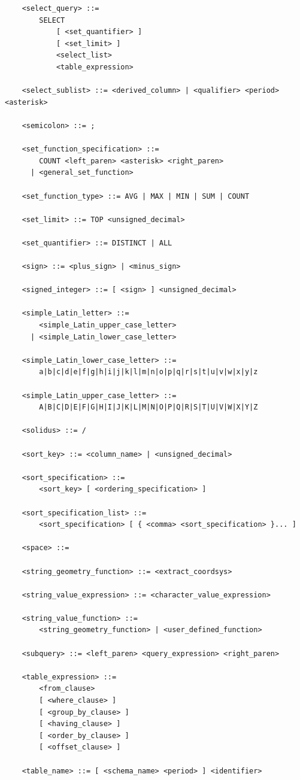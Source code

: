 \documentclass[11pt,a4paper]{ivoa}
\begin{document}
\begin{verbatim}
    <select_query> ::=
        SELECT
            [ <set_quantifier> ]
            [ <set_limit> ]
            <select_list>
            <table_expression>

    <select_sublist> ::= <derived_column> | <qualifier> <period> <asterisk>

    <semicolon> ::= ;

    <set_function_specification> ::=
        COUNT <left_paren> <asterisk> <right_paren>
      | <general_set_function>

    <set_function_type> ::= AVG | MAX | MIN | SUM | COUNT

    <set_limit> ::= TOP <unsigned_decimal>

    <set_quantifier> ::= DISTINCT | ALL

    <sign> ::= <plus_sign> | <minus_sign>

    <signed_integer> ::= [ <sign> ] <unsigned_decimal>

    <simple_Latin_letter> ::=
        <simple_Latin_upper_case_letter>
      | <simple_Latin_lower_case_letter>

    <simple_Latin_lower_case_letter> ::=
        a|b|c|d|e|f|g|h|i|j|k|l|m|n|o|p|q|r|s|t|u|v|w|x|y|z

    <simple_Latin_upper_case_letter> ::=
        A|B|C|D|E|F|G|H|I|J|K|L|M|N|O|P|Q|R|S|T|U|V|W|X|Y|Z

    <solidus> ::= /

    <sort_key> ::= <column_name> | <unsigned_decimal>

    <sort_specification> ::=
        <sort_key> [ <ordering_specification> ]

    <sort_specification_list> ::=
        <sort_specification> [ { <comma> <sort_specification> }... ]

    <space> ::=

    <string_geometry_function> ::= <extract_coordsys>

    <string_value_expression> ::= <character_value_expression>

    <string_value_function> ::=
        <string_geometry_function> | <user_defined_function>

    <subquery> ::= <left_paren> <query_expression> <right_paren>

    <table_expression> ::=
        <from_clause>
        [ <where_clause> ]
        [ <group_by_clause> ]
        [ <having_clause> ]
        [ <order_by_clause> ]
        [ <offset_clause> ]

    <table_name> ::= [ <schema_name> <period> ] <identifier>


\end{verbatim}
\end{document}

